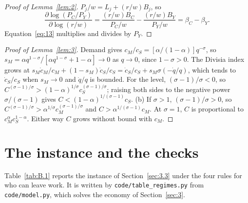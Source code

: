 \documentclass[12pt]{article}
\theoremstyle{plain}
\begin{document}
\begin{proof}[Proof of Lemma~\ref{lem:2}]
$P_j/w=L_j+(r/w)B_j$, so
\[
\frac{\partial\log(P_C/P_Y)}{\partial\log(r/w)}=\frac{(r/w)B_C}{P_C/w}-\frac{(r/w)B_Y}{P_Y/w}=\beta_C-\beta_Y.
\]
Equation~\eqref{eq:13} multiplies and divides by $P_Y$.
\end{proof}

\begin{proof}[Proof of Lemma~\ref{lem:3}]
Demand gives $c_M/c_S=[\alpha/(1-\alpha)]q^{-\sigma}$, so $s_M=\alpha q^{1-\sigma}/[\alpha q^{1-\sigma}+1-\alpha]\to0$ as $q\to0$, since $1-\sigma>0$. The Divisia index grows at $s_M\dot c_M/c_M+(1-s_M)\dot c_S/c_S=\dot c_S/c_S+s_M\sigma(-\dot q/q)$, which tends to $\dot c_S/c_S$ when $s_M\to0$ and $\dot q/q$ is bounded. For the level, $(\sigma-1)/\sigma<0$, so $C^{(\sigma-1)/\sigma}>(1-\alpha)^{1/\sigma}c_S^{(\sigma-1)/\sigma}$; raising both sides to the negative power $\sigma/(\sigma-1)$ gives $C<(1-\alpha)^{1/(\sigma-1)}c_S$. (b) If $\sigma>1$, $(\sigma-1)/\sigma>0$, so $C^{(\sigma-1)/\sigma}>\alpha^{1/\sigma}c_M^{(\sigma-1)/\sigma}$ and $C>\alpha^{1/(\sigma-1)}c_M$. At $\sigma=1$, $C$ is proportional to $c_M^\alpha c_S^{1-\alpha}$. Either way $C$ grows without bound with $c_M$.
\end{proof}

\section{The instance and the checks}\label{app:B}

Table~\ref{tab:B.1} reports the instance of Section~\ref{sec:3.3} under the four rules for who can leave work. It is written by \texttt{code/table\_regimes.py} from \texttt{code/model.py}, which solves the economy of Section~\ref{sec:3}.

\begin{table}[htbp]
\centering
\caption{The instance under four rules for who can leave work.}
\label{tab:B.1}

\end{table}
\end{document}
